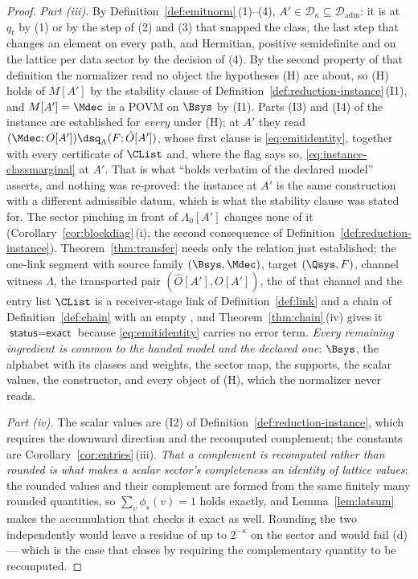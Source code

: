 \begin{proof}
\emph{Part (iii).} By Definition~\ref{def:emitnorm}\,(1)--(4),
$A'\in\mathcal{D}_{\kappa}\subseteq\mathcal{D}_{\mathrm{adm}}$: it is
 at $q_t$ by (1) or by the step of (2) and (3) that
snapped the class, the last step that changes an element on every path, and
Hermitian, positive semidefinite and on the lattice per data sector by the
decision of (4). By
the second property of that definition the normalizer read no object the
hypotheses (H) are about, so (H) holds of $M[A']$ by the stability clause of
Definition~\ref{def:reduction-instance}\,(I1), and $M[A']=\Mdec$ is a POVM on
$\Bsys$ by (I1). Parts (I3) and (I4) of the instance are established for
\emph{every}  under (H); at $A'$ they read
$(\Mdec;O[A'])\dsq_{\Lambda}(F;\hat O[A'])$, whose first clause is
\eqref{eq:emitidentity}, together with every certificate of $\CList$ and,
where the flag says so, \eqref{eq:instance-classmarginal} at $A'$. That is
what ``holds verbatim of the declared model'' asserts, and nothing was
re-proved: the instance at $A'$ is the same construction with a different
admissible datum, which is what the stability clause was stated for. The
sector pinching in front of $\Lambda_0[A']$ changes none of it
(Corollary~\ref{cor:blockdiag}\,(i), the second consequence of
Definition~\ref{def:reduction-instance}). Theorem~\ref{thm:transfer} needs
only the relation just established; the one-link segment with source family
$(\Bsys,\Mdec)$, target $(\Qsys,F)$, channel witness $\Lambda$, the transported
pair $(\hat O[A'],O[A'])$, the  of that channel
and the entry list $\CList$ is a receiver-stage link of
Definition~\ref{def:link} and a chain of Definition~\ref{def:chain} with an
empty , and Theorem~\ref{thm:chain}\,(iv) gives it
$\textsf{status}=\textsf{exact}$ because \eqref{eq:emitidentity} carries no
error term. \emph{Every remaining ingredient is common to the handed model and
the declared one}: $\Bsys$, the alphabet with its classes and weights, the
sector map, the supports, the scalar values, the constructor, and every object
of (H), which the normalizer never reads.

\emph{Part (iv).} The scalar values are (I2) of
Definition~\ref{def:reduction-instance}, which requires the downward direction
and the recomputed complement; the constants are
Corollary~\ref{cor:entries}\,(iii). \emph{That a complement is recomputed
rather than rounded is what makes a scalar sector's completeness an identity
of lattice values}: the rounded values and their complement are formed from
the same finitely many rounded quantities, so $\sum_v\phi_s(v)=1$ holds
exactly, and Lemma~\ref{lem:latsum} makes the accumulation that checks it
exact as well. Rounding the two independently would leave a residue of up to
$2^{-\kappa}$ on the sector and would fail (d) --- which is the case that
 closes by requiring the
complementary quantity to be recomputed.


\end{proof}
